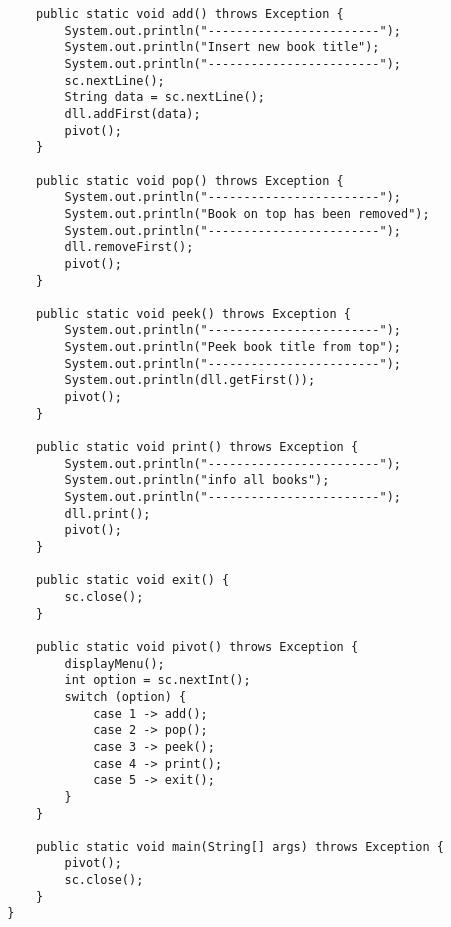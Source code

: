 \documentclass[12pt,titlepage]{article}
\begin{document}
\begin{enumerate}
\begin{verbatim}
            public static void add() throws Exception {
                System.out.println("------------------------");
                System.out.println("Insert new book title");
                System.out.println("------------------------");
                sc.nextLine();
                String data = sc.nextLine();
                dll.addFirst(data);
                pivot();
            }
            
            public static void pop() throws Exception {
                System.out.println("------------------------");
                System.out.println("Book on top has been removed");
                System.out.println("------------------------");
                dll.removeFirst();
                pivot();
            }

            public static void peek() throws Exception {
                System.out.println("------------------------");
                System.out.println("Peek book title from top");
                System.out.println("------------------------");
                System.out.println(dll.getFirst());
                pivot();
            }

            public static void print() throws Exception {
                System.out.println("------------------------");
                System.out.println("info all books");
                System.out.println("------------------------");
                dll.print();
                pivot();
            }

            public static void exit() {
                sc.close();
            }
            
            public static void pivot() throws Exception {
                displayMenu();
                int option = sc.nextInt();
                switch (option) {
                    case 1 -> add();
                    case 2 -> pop();
                    case 3 -> peek();
                    case 4 -> print();
                    case 5 -> exit();
                }
            }
            
            public static void main(String[] args) throws Exception {
                pivot();
                sc.close();
            }
        }


\end{verbatim}
\end{enumerate}
\end{document}
